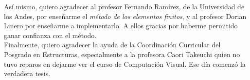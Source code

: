 Así mismo, quiero agradecer al profesor Fernando Ramírez, de la Universidad de los Andes, por enseñarme el \emph{método de los elementos finitos}, y al profesor Dorian Linero por enseñarme a implementarlo. A ellos gracias por haberme permitido ganar confianza con el método.\\

Finalmente, quiero agradecer la ayuda de la Coordinación Curricular del Posgrado en Estructuras, especialmente a la profesora Caori Takeuchi quien no tuvo reparos en dejarme ver el curso de Computación Visual. Ese día comenzó la verdadera tesis.\\


\newpage{\pagestyle{empty}\cleardoublepage}

\newpage






